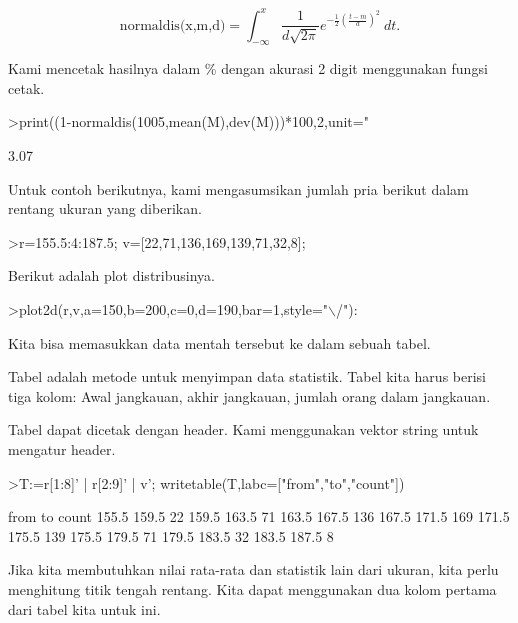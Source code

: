 \documentclass{article}
\begin{document}
\begin{eulernotebook}
\begin{eulercomment}
\begin{eulercomment}
\begin{eulercomment}
\end{eulercomment}
\begin{eulerformula}
\[
\text{normaldis(x,m,d)}=\int_{-\infty}^x \frac{1}{d\sqrt{2\pi}}e^{-\frac{1}{2}(\frac{t-m}{d})^2}\ dt.
\]
\end{eulerformula}
\begin{eulercomment}
Kami mencetak hasilnya dalam \% dengan akurasi 2 digit menggunakan
fungsi cetak.
\end{eulercomment}
\begin{eulerprompt}
>print((1-normaldis(1005,mean(M),dev(M)))*100,2,unit=" %
\end{eulerprompt}
\begin{euleroutput}
        3.07 %
\end{euleroutput}
\begin{eulercomment}
Untuk contoh berikutnya, kami mengasumsikan jumlah pria berikut dalam
rentang ukuran yang diberikan.
\end{eulercomment}
\begin{eulerprompt}
>r=155.5:4:187.5; v=[22,71,136,169,139,71,32,8];
\end{eulerprompt}
\begin{eulercomment}
Berikut adalah plot distribusinya.
\end{eulercomment}
\begin{eulerprompt}
>plot2d(r,v,a=150,b=200,c=0,d=190,bar=1,style="\(\backslash\)/"):
\end{eulerprompt}
\begin{eulercomment}
Kita bisa memasukkan data mentah tersebut ke dalam sebuah tabel.

Tabel adalah metode untuk menyimpan data statistik. Tabel kita harus
berisi tiga kolom: Awal jangkauan, akhir jangkauan, jumlah orang dalam
jangkauan.

Tabel dapat dicetak dengan header. Kami menggunakan vektor string
untuk mengatur header.
\end{eulercomment}
\begin{eulerprompt}
>T:=r[1:8]' | r[2:9]' | v'; writetable(T,labc=["from","to","count"])
\end{eulerprompt}
\begin{euleroutput}
        from        to     count
       155.5     159.5        22
       159.5     163.5        71
       163.5     167.5       136
       167.5     171.5       169
       171.5     175.5       139
       175.5     179.5        71
       179.5     183.5        32
       183.5     187.5         8
\end{euleroutput}
\begin{eulercomment}
Jika kita membutuhkan nilai rata-rata dan statistik lain dari ukuran,
kita perlu menghitung titik tengah rentang. Kita dapat menggunakan dua
kolom pertama dari tabel kita untuk ini.


\end{eulercomment}
\end{eulercomment}
\end{eulercomment}
\end{eulernotebook}
\end{document}
